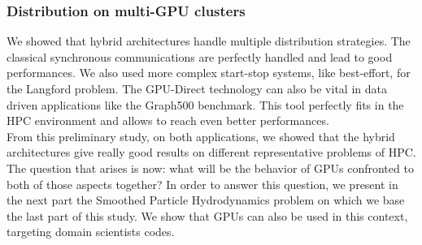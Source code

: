 \subsubsection{Distribution on multi-GPU clusters}
We showed that hybrid architectures handle multiple distribution strategies. 
The classical synchronous communications are perfectly handled and lead to good performances. 
We also used more complex start-stop systems, like best-effort, for the Langford problem. 
The GPU-Direct technology can also be vital in data driven applications like the Graph500 benchmark.
This tool perfectly fits in the HPC environment and allows to reach even better performances. \\

From this preliminary study, on both applications, we showed that the hybrid architectures give really good results on different representative problems of HPC. 
The question that arises is now: what will be the behavior of GPUs confronted to both of those aspects together? 
In order to answer this question, we present in the next part the Smoothed Particle Hydrodynamics problem on which we base the last part of this study. 
We show that GPUs can also be used in this context, targeting domain scientists codes.\\
